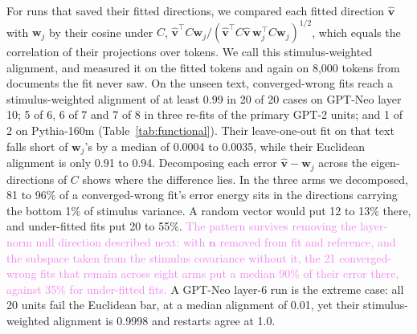 \documentclass[10pt]{article}
\newcommand{\draft}[1]{\textcolor{violet}{#1}}
\begin{document}
For runs that saved their fitted directions, we compared each fitted direction
$\hat{\mathbf{v}}$ with $\mathbf{w}_j$ by their cosine under $C$,
$\hat{\mathbf{v}}^\top C\mathbf{w}_j / (\hat{\mathbf{v}}^\top C\hat{\mathbf{v}}\,
\mathbf{w}_j^\top C\mathbf{w}_j)^{1/2}$, which equals the correlation of their projections over
tokens. We call this stimulus-weighted alignment, and measured it on the fitted tokens and again
on 8{,}000 tokens from documents the fit never saw. On the unseen text, converged-wrong fits
reach a stimulus-weighted alignment of at least 0.99 in 20 of 20 cases on GPT-Neo layer 10; 5 of
6, 6 of 7 and 7 of 8 in three re-fits of the primary GPT-2 units; and 1 of 2 on Pythia-160m
(Table~\ref{tab:functional}). Their leave-one-out fit on that text falls short of
$\mathbf{w}_j$'s by a median of 0.0004 to 0.0035, while their Euclidean alignment is only 0.91 to
0.94. Decomposing each error $\hat{\mathbf{v}}-\mathbf{w}_j$ across the eigen-directions of
$C$ shows where the difference lies. In the three arms we decomposed, 81 to 96\% of a
converged-wrong fit's error energy sits in the directions carrying the bottom 1\% of stimulus
variance. A random vector would put 12 to 13\% there, and under-fitted fits put 20 to 55\%.
\draft{The pattern survives removing the layer-norm null direction described next: with
$\mathbf{n}$ removed from fit and reference, and the subspace taken from the stimulus covariance
without it, the 21 converged-wrong fits that remain across eight arms put a median 90\% of
their error there, against 35\% for under-fitted fits.}
A GPT-Neo layer-6 run is the extreme case: all 20 units fail the Euclidean bar, at a median
alignment of 0.01, yet their stimulus-weighted alignment is 0.9998 and restarts agree at 1.0.
\end{document}
